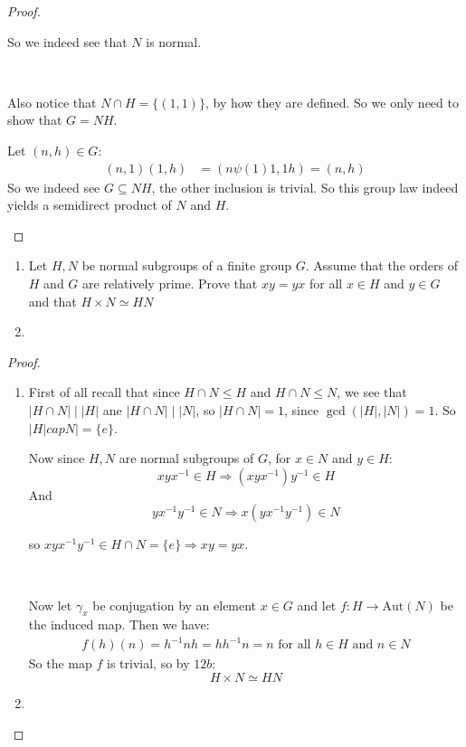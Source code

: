 \begin{exercise}
\begin{proof}
\begin{enumerate}[label = (\alph*)]
                So we indeed see that $N$ is normal.

                \

                Also notice that $N\cap H = \{(1,1)\}$, by how they are defined. So we only need to show that $G = NH$.
                
                Let $(n,h)\in G$:\begin{align*}
                    (n,1)(1,h) &= (n\psi(1)1, 1h) = (n,h)
                \end{align*}
                So we indeed see $G\subseteq NH$, the other inclusion is trivial. So this group law indeed yields a semidirect product of $N$ and $H$.
            \end{enumerate}    
    \end{proof}
\end{exercise}

\begin{exercise}
    \begin{enumerate}[label = (\alph*)]
        \item Let $H,N$ be normal subgroups of a finite group $G$. Assume that the orders of $H$ and $G$ are relatively prime. Prove that $xy=yx$ for all $x\in H$ and $y\in G$ and that $H\times N\simeq HN$
        \item 
    \end{enumerate}
    \begin{proof}
        \begin{enumerate}[label = (\alph*)]
            \item First of all recall that since $H\cap N\leq H$ and $H\cap N\leq N$, we see that $|H\cap N| \mid |H|$ ane $|H\cap N|\mid |N|$, so $|H\cap N| = 1$, since $\gcd(|H|,|N|) = 1$. So $|H|cap N| = \{e\}$.
            
            Now since $H,N$ are normal subgroups of $G$, for $x\in N$ and $y\in H$:\begin{equation*}
                xyx^{-1}\in H \Rightarrow (xyx^{-1})y^{-1}\in H
            \end{equation*}
            And \begin{equation*}
                yx^{-1}y^{-1}\in N \Rightarrow x(yx^{-1}y^{-1})\in N
            \end{equation*}

            so $xyx^{-1}y^{-1}\in H\cap N = \{e\} \Rightarrow xy = yx$.

            \

            Now let $\gamma_x$ be conjugation by an element $x\in G$ and let $f\colon H\rightarrow \text{Aut}(N)$ be the induced map. Then we have:\begin{align*}
                f(h)(n) = h^{-1}nh = hh^{-1}n = n \text{ for all }h\in H \text{ and }n\in N
            \end{align*}
            So the map $f$ is trivial, so by $12b$:\[H\times N \simeq HN\]
            \item 
        \end{enumerate}
    \end{proof}
\end{exercise}
